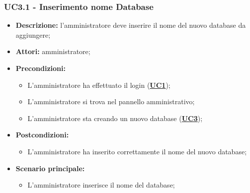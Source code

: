 \subsubsection{UC3.1 - Inserimento nome Database}
\label{sec:UC3.1}
\begin{itemize}
	\item \textbf{Descrizione:} l’amministratore deve inserire il nome del nuovo database da aggiungere;
	\item \textbf{Attori:} amministratore;
	\item \textbf{Precondizioni:} 
	\begin{itemize}
		\item L’amministratore ha effettuato il login (\hyperref[sec:UC1]{\textbf{UC1}});
		\item L’amministratore si trova nel pannello amministrativo;
		\item L’amministratore sta creando un nuovo database (\hyperref[sec:UC3]{\textbf{UC3}});
	\end{itemize}
	\item \textbf{Postcondizioni:} 
	\begin{itemize}
		\item L'amministratore ha inserito correttamente il nome del nuovo database;
	\end{itemize}
	\item \textbf{Scenario principale:} 
	\begin{itemize}
		\item L’amministratore inserisce il nome del database;
	\end{itemize}
\end{itemize}


